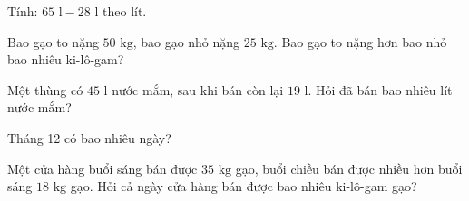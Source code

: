 \begin{ex} %
Tính: $65\text{ l} - 28\text{ l}$ theo lít.
\end{ex}

\begin{ex} %
Bao gạo to nặng $50\text{ kg}$, bao gạo nhỏ nặng $25\text{ kg}$. Bao gạo to nặng hơn bao nhỏ bao nhiêu ki-lô-gam?
\end{ex}

\begin{ex} %
Một thùng có $45\text{ l}$ nước mắm, sau khi bán còn lại $19\text{ l}$. Hỏi đã bán bao nhiêu lít nước mắm?
\end{ex}

\begin{ex} %
Tháng 12 có bao nhiêu ngày?
\end{ex}

\begin{ex} %
Một cửa hàng buổi sáng bán được $35\text{ kg}$ gạo, buổi chiều bán được nhiều hơn buổi sáng $18\text{ kg}$ gạo. Hỏi cả ngày cửa hàng bán được bao nhiêu ki-lô-gam gạo?
\end{ex}
